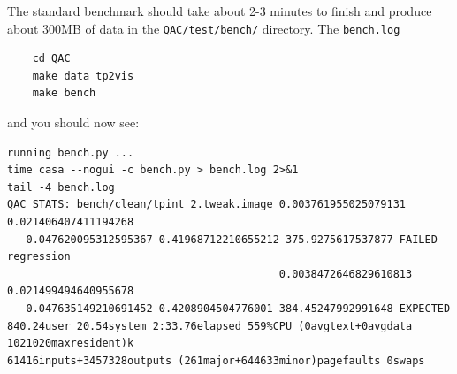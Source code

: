\documentclass[11pt,twoside]{article}
\begin{document}
The standard benchmark should take about 2-3 minutes to finish and produce about 300MB of
data in the \verb+QAC/test/bench/+ directory. The \verb+bench.log+ 

\footnotesize
\begin{verbatim}
    cd QAC
    make data tp2vis
    make bench
\end{verbatim}
\normalsize

\noindent
and you should now see:

\footnotesize
\begin{verbatim}
running bench.py ...
time casa --nogui -c bench.py > bench.log 2>&1
tail -4 bench.log
QAC_STATS: bench/clean/tpint_2.tweak.image 0.003761955025079131 0.021406407411194268
  -0.047620095312595367 0.41968712210655212 375.9275617537877 FAILED regression
                                           0.0038472646829610813 0.021499494640955678
  -0.047635149210691452 0.4208904504776001 384.45247992991648 EXPECTED
840.24user 20.54system 2:33.76elapsed 559%CPU (0avgtext+0avgdata 1021020maxresident)k
61416inputs+3457328outputs (261major+644633minor)pagefaults 0swaps


\end{verbatim}
\normalsize
\end{document}
